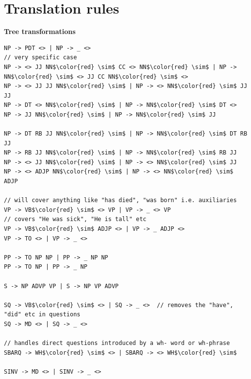 \documentclass[12pt]{ociamthesis}  %
\begin{document}
{\pagestyle{plain}
\newpage

\makeatletter
\renewcommand\@biblabel[1]{}
\makeatother
{}



\appendix
\chapter{Translation rules}
\label{appendix:rules}
\textbf{Tree transformations}
\begin{lstlisting}[language=Rules,mathescape=true, caption = tree\_transforms.txt]
NP -> PDT <> | NP -> _ <>
// very specific case
NP -> <> JJ NN$\color{red} \sim$ CC <> NN$\color{red} \sim$ | NP -> NN$\color{red} \sim$ <> JJ CC NN$\color{red} \sim$ <>
NP -> <> JJ JJ NN$\color{red} \sim$ | NP -> <> NN$\color{red} \sim$ JJ JJ
NP -> DT <> NN$\color{red} \sim$ | NP -> NN$\color{red} \sim$ DT <>
NP -> JJ NN$\color{red} \sim$ | NP -> NN$\color{red} \sim$ JJ

NP -> DT RB JJ NN$\color{red} \sim$ | NP -> NN$\color{red} \sim$ DT RB JJ 
NP -> RB JJ NN$\color{red} \sim$ | NP -> NN$\color{red} \sim$ RB JJ
NP -> <> JJ NN$\color{red} \sim$ | NP -> <> NN$\color{red} \sim$ JJ
NP -> <> ADJP NN$\color{red} \sim$ | NP -> <> NN$\color{red} \sim$ ADJP

// will cover anything like "has died", "was born" i.e. auxiliaries
VP -> VB$\color{red} \sim$ <> VP | VP -> _ <> VP 
// covers "He was sick", "He is tall" etc
VP -> VB$\color{red} \sim$ ADJP <> | VP -> _ ADJP <>
VP -> TO <> | VP -> _ <>

PP -> TO NP NP | PP -> _ NP NP
PP -> TO NP | PP -> _ NP

S -> NP ADVP VP | S -> NP VP ADVP

SQ -> VB$\color{red} \sim$ <> | SQ -> _ <>  // removes the "have", "did" etc in questions
SQ -> MD <> | SQ -> _ <>

// handles direct questions introduced by a wh- word or wh-phrase
SBARQ -> WH$\color{red} \sim$ <> | SBARQ -> <> WH$\color{red} \sim$ 

SINV -> MD <> | SINV -> _ <>


\end{lstlisting}}
\end{document}
